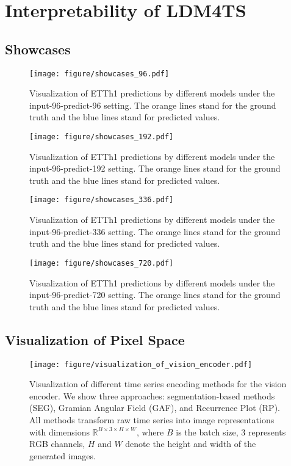 \newpage
\section{Interpretability of LDM4TS}
\subsection{Showcases}
\label{appx:showcases}
\begin{figure}[!ht]
  \centering
  \texttt{[image: figure/showcases\_96.pdf]}
\caption{Visualization of ETTh1 predictions by different models under the input-96-predict-96 setting. The orange lines stand for the ground truth and the blue lines stand for predicted values.}
\label{fig:showcases_96}
\end{figure}

\begin{figure}[!ht]
  \centering
  \texttt{[image: figure/showcases\_192.pdf]}
\caption{Visualization of ETTh1 predictions by different models under the input-96-predict-192 setting. The orange lines stand for the ground truth and the blue lines stand for predicted values.}
\label{fig:showcases_192}
\end{figure}

\begin{figure}[!ht]
  \centering
  \texttt{[image: figure/showcases\_336.pdf]}
\caption{Visualization of ETTh1 predictions by different models under the input-96-predict-336 setting. The orange lines stand for the ground truth and the blue lines stand for predicted values.}
\label{fig:showcases_336}
\end{figure}

\begin{figure}[!ht]
  \centering
  \texttt{[image: figure/showcases\_720.pdf]}
\caption{Visualization of ETTh1 predictions by different models under the input-96-predict-720 setting. The orange lines stand for the ground truth and the blue lines stand for predicted values.}
\label{fig:showcases_720}
\end{figure}

\newpage
\subsection{Visualization of Pixel Space}
\label{appx:visualization_picel_space}
\begin{figure*}[!ht]
  \centering
  \texttt{[image: figure/visualization\_of\_vision\_encoder.pdf]}
\caption{Visualization of different time series encoding methods for the vision encoder. We show three approaches: segmentation-based methods (SEG), Gramian Angular Field (GAF), and Recurrence Plot (RP). All methods transform raw time series into image representations with dimensions $\mathbb{R}^{B\times3 \times H\times W}$, where $B$ is the batch size, 3 represents RGB channels, $H$ and $W$ denote the height and width of the generated images.}
\label{fig:visualization_ve}
\end{figure*}